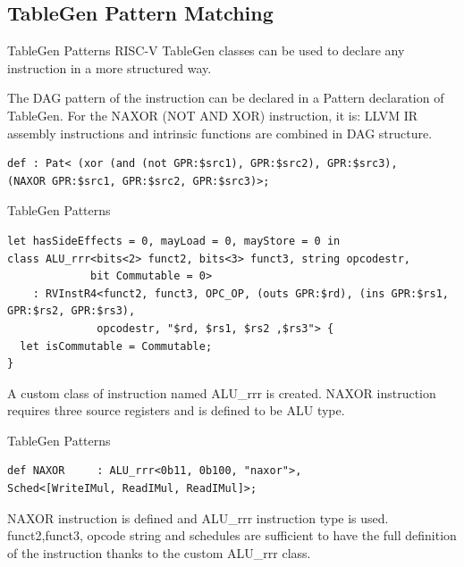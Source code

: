 \subsection{TableGen Pattern Matching}
\begin{frame}[fragile]{TableGen Patterns}
RISC-V TableGen classes can be used to declare any instruction in a more structured way.
\par
The DAG pattern of the instruction can be declared in a Pattern declaration of TableGen. For the NAXOR (NOT AND XOR) instruction, it is: LLVM IR assembly instructions and intrinsic functions are combined in DAG structure.

\begin{lstlisting}
def : Pat< (xor (and (not GPR:$src1), GPR:$src2), GPR:$src3),
(NAXOR GPR:$src1, GPR:$src2, GPR:$src3)>;
\end{lstlisting}
\end{frame}

        
        

\begin{frame}[fragile]{TableGen Patterns}
\begin{lstlisting}
let hasSideEffects = 0, mayLoad = 0, mayStore = 0 in
class ALU_rrr<bits<2> funct2, bits<3> funct3, string opcodestr,
             bit Commutable = 0>
    : RVInstR4<funct2, funct3, OPC_OP, (outs GPR:$rd), (ins GPR:$rs1, GPR:$rs2, GPR:$rs3),
              opcodestr, "$rd, $rs1, $rs2 ,$rs3"> {
  let isCommutable = Commutable;
}
\end{lstlisting}
A custom class of instruction named ALU\_rrr is created. NAXOR instruction requires three source registers and is defined to be ALU type. 
\end{frame}


        
\begin{frame}[fragile]{TableGen Patterns}
\begin{lstlisting}
def NAXOR     : ALU_rrr<0b11, 0b100, "naxor">,
Sched<[WriteIMul, ReadIMul, ReadIMul]>;
\end{lstlisting}
NAXOR instruction is defined and ALU\_rrr instruction type is used. funct2,funct3, opcode string and schedules are sufficient to have the full definition of the instruction thanks to the custom ALU\_rrr class.
\end{frame}



